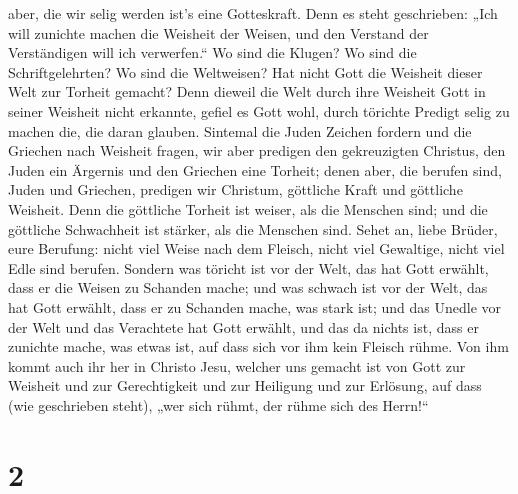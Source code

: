 aber, die wir selig werden ist's eine Gotteskraft.  Denn
es steht geschrieben: „Ich will zunichte machen die Weisheit der Weisen,
und den Verstand der Verständigen will ich verwerfen.`` 
Wo sind die Klugen? Wo sind die Schriftgelehrten? Wo sind die
Weltweisen? Hat nicht Gott die Weisheit dieser Welt zur Torheit gemacht?
 Denn dieweil die Welt durch ihre Weisheit Gott in seiner
Weisheit nicht erkannte, gefiel es Gott wohl, durch törichte Predigt
selig zu machen die, die daran glauben.  Sintemal die
Juden Zeichen fordern und die Griechen nach Weisheit fragen,
 wir aber predigen den gekreuzigten Christus, den Juden
ein Ärgernis und den Griechen eine Torheit;  denen aber,
die berufen sind, Juden und Griechen, predigen wir Christum, göttliche
Kraft und göttliche Weisheit.  Denn die göttliche Torheit
ist weiser, als die Menschen sind; und die göttliche Schwachheit ist
stärker, als die Menschen sind.  Sehet an, liebe Brüder,
eure Berufung: nicht viel Weise nach dem Fleisch, nicht viel Gewaltige,
nicht viel Edle sind berufen.  Sondern was töricht ist
vor der Welt, das hat Gott erwählt, dass er die Weisen zu Schanden
mache; und was schwach ist vor der Welt, das hat Gott erwählt, dass er
zu Schanden mache, was stark ist;  und das Unedle vor der
Welt und das Verachtete hat Gott erwählt, und das da nichts ist, dass er
zunichte mache, was etwas ist,  auf dass sich vor ihm
kein Fleisch rühme.  Von ihm kommt auch ihr her in
Christo Jesu, welcher uns gemacht ist von Gott zur Weisheit und zur
Gerechtigkeit und zur Heiligung und zur Erlösung,  auf
dass (wie geschrieben steht), „wer sich rühmt, der rühme sich des
Herrn!{}``

\hypertarget{section-1}{%
\section{2}\label{section-1}}

